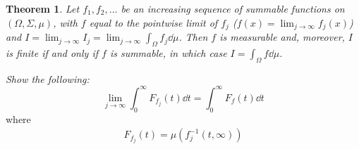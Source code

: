 \documentclass[12pt]{article}
\theoremstyle{plain}
\newtheorem{theorem}{Theorem}
\begin{document}
\begin{theorem}
    Let $f_1, f_2, \dots$ be an increasing sequence of summable functions on $(\Omega, \Sigma, \mu)$, with $f$ equal to the pointwise limit of $f_j$ ($f(x) = \lim_{j\rightarrow \infty}f_j(x)$) and $I = \lim_{j\rightarrow \infty} I_j = \lim_{j\rightarrow \infty} \int_{\Omega}f_j \dd \mu$.  Then $f$ is measurable and, moreover, $I$ is finite if and only if $f$ is summable, in which case $I = \int_{\Omega} f \dd \mu$.
\end{theorem}
\textit{Show the following:}
\begin{equation}\tag{2}
    \lim_{j\rightarrow \infty} \int_0^\infty F_{f_j}(t) \dd t = \int_0^\infty F_f(t) \dd t
\end{equation}
where
\begin{align*}
    F_{f_j}(t) = \mu(f^{-1}_j(t, \infty))
\end{align*}
\end{document}
